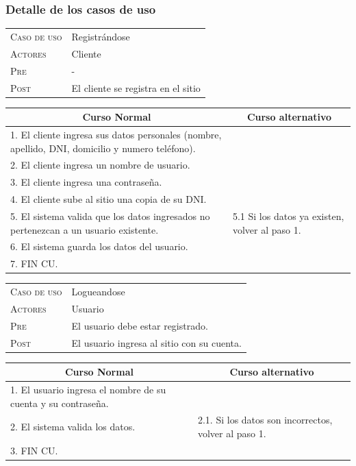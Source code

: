 \subsubsection{Detalle de los casos de uso}

\begin{tabular}{p{} p{}}
    \textsc{Caso de uso} & Registrándose \\
    \textsc{Actores} & Cliente \\
    \textsc{Pre} & - \\
    \textsc{Post} & El cliente se registra en el sitio \\
\end{tabular}

\begin{center}
\begin{tabular}{|p{}|p{}|}
    \hline
    \multicolumn{1}{|c|}{Curso Normal} &
    \multicolumn{1}{|c|}{Curso alternativo} \\
    \hline
    1. El cliente ingresa sus datos personales (nombre, apellido, DNI, domicilio y numero teléfono). & \\
    2. El cliente ingresa un nombre de usuario. & \\
    3. El cliente ingresa una contraseña. & \\
    4. El cliente sube al sitio una copia de su DNI. & \\
    5. El sistema valida que los datos ingresados no pertenezcan a un usuario
    existente. &
    5.1 Si los datos ya existen, volver al paso 1.  \\
    6. El sistema guarda los datos del usuario. & \\
    7. FIN CU. & \\
    \hline
\end{tabular}
\end{center}

\begin{tabular}{p{} p{}}
    \textsc{Caso de uso} & Logueandose \\
    \textsc{Actores} & Usuario \\
    \textsc{Pre} & El usuario debe estar registrado. \\
    \textsc{Post} & El usuario ingresa al sitio con su cuenta. \\
\end{tabular}

\begin{center}
\begin{tabular}{|p{}|p{}|}
    \hline
    \multicolumn{1}{|c|}{Curso Normal} &
    \multicolumn{1}{|c|}{Curso alternativo} \\
    \hline
    1. El usuario ingresa el nombre de su cuenta y su contraseña. & \\
    2. El sistema valida los datos. &
    2.1. Si los datos son incorrectos, volver al paso 1. \\
    3. FIN CU. & \\
    \hline
\end{tabular}
\end{center}

